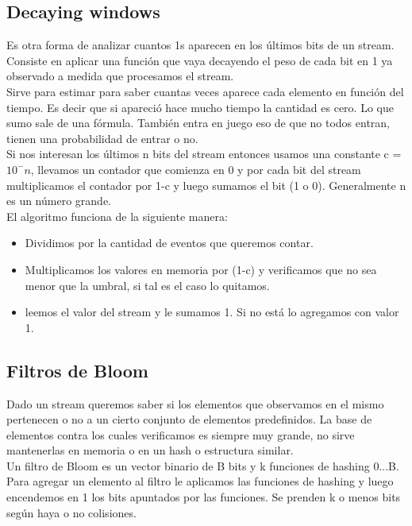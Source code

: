 \documentclass[titlepage,a4paper]{article}
\begin{document}
\subsection*{Decaying windows}
Es otra forma de analizar cuantos 1s aparecen en los últimos bits de un stream. Consiste en aplicar una función que vaya decayendo el peso de cada bit en 1 ya observado a medida que procesamos el stream. \\
 
 Sirve para estimar para saber cuantas veces aparece cada elemento en función del tiempo. Es decir que si apareció hace mucho tiempo la cantidad es cero. Lo que sumo sale de una fórmula. También entra en juego eso de que no todos entran, tienen una probabilidad de entrar o no. \\

Si nos interesan los últimos n bits del stream entonces usamos una constante c = $10^-n$, llevamos un contador que comienza en 0 y por cada bit del stream multiplicamos el contador por 1-c y luego sumamos el bit (1 o 0). Generalmente n es un número grande. \\

El algoritmo funciona de la siguiente manera: \\
\begin{itemize}
\item Dividimos por la cantidad de eventos que queremos contar. 
\item Multiplicamos los valores en memoria por (1-c) y verificamos que no sea menor que la umbral, si tal es el caso lo quitamos. 
\item leemos el valor del stream y le sumamos 1. Si no está lo agregamos con valor 1. 
\end{itemize}
 
 
\subsection*{Filtros de Bloom}
Dado un stream queremos saber si los elementos que observamos en el mismo pertenecen o no a un cierto conjunto de elementos predefinidos. La base de elementos contra los cuales verificamos es siempre muy grande, no sirve mantenerlas en memoria o en un hash o estructura similar. \\

Un filtro de Bloom es un vector binario de B bits y k funciones de hashing 0...B. Para agregar un elemento al filtro le aplicamos las funciones de hashing y luego encendemos en 1 los bits apuntados por las funciones. Se prenden k o menos bits según haya o no colisiones. \\
\end{document}
